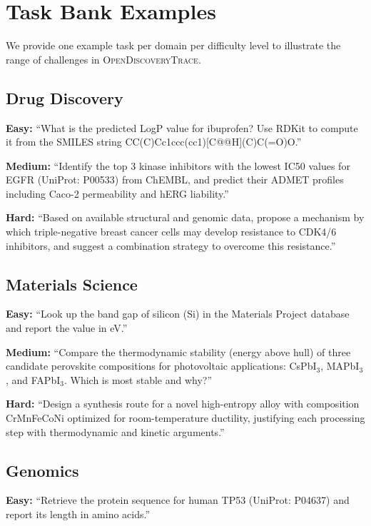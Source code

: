 \documentclass{article}
\newcommand{\dataset}{\textsc{OpenDiscoveryTrace}\xspace}
\begin{document}
\section{Task Bank Examples}
\label{app:tasks}

We provide one example task per domain per difficulty level to illustrate the range of challenges in \dataset.

\subsection{Drug Discovery}

\textbf{Easy:} ``What is the predicted LogP value for ibuprofen? Use RDKit to compute it from the SMILES string CC(C)Cc1ccc(cc1)[C@@H](C)C(=O)O.''

\textbf{Medium:} ``Identify the top 3 kinase inhibitors with the lowest IC50 values for EGFR (UniProt: P00533) from ChEMBL, and predict their ADMET profiles including Caco-2 permeability and hERG liability.''

\textbf{Hard:} ``Based on available structural and genomic data, propose a mechanism by which triple-negative breast cancer cells may develop resistance to CDK4/6 inhibitors, and suggest a combination strategy to overcome this resistance.''

\subsection{Materials Science}

\textbf{Easy:} ``Look up the band gap of silicon (Si) in the Materials Project database and report the value in eV.''

\textbf{Medium:} ``Compare the thermodynamic stability (energy above hull) of three candidate perovskite compositions for photovoltaic applications: CsPbI$_3$, MAPbI$_3$, and FAPbI$_3$. Which is most stable and why?''

\textbf{Hard:} ``Design a synthesis route for a novel high-entropy alloy with composition CrMnFeCoNi optimized for room-temperature ductility, justifying each processing step with thermodynamic and kinetic arguments.''

\subsection{Genomics}

\textbf{Easy:} ``Retrieve the protein sequence for human TP53 (UniProt: P04637) and report its length in amino acids.''
\end{document}
